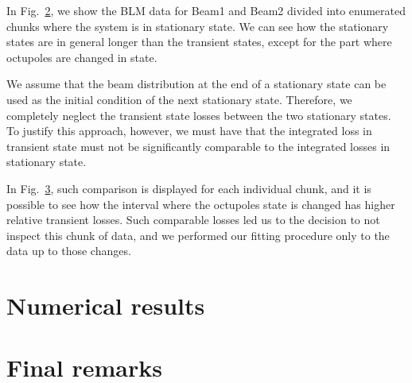 \begin{figure}
    \centering
    \caption{}
    \label{fig:transient-state}
\end{figure}

In Fig.~\ref{fig:chunks}, we show the BLM data for Beam1 and Beam2 divided into enumerated chunks where the system is in stationary state. We can see how the stationary states are in general longer than the transient states, except for the part where octupoles are changed in state.

\begin{figure}
    \centering
    \caption{}
    \label{fig:chunks}
\end{figure}

We assume that the beam distribution at the end of a stationary state can be used as the initial condition of the next stationary state. Therefore, we completely neglect the transient state losses between the two stationary states. To justify this approach, however, we must have that the integrated loss in transient state must not be significantly comparable to the integrated losses in stationary state.

In Fig.~\ref{fig:wire_loss_comp}, such comparison is displayed for each individual chunk, and it is possible to see how the interval where the octupoles state is changed has higher relative transient losses. Such comparable losses led us to the decision to not inspect this chunk of data, and we performed our fitting procedure only to the data up to those changes.

\begin{figure}
    \centering
    \caption{}
    \label{fig:wire_loss_comp}
\end{figure}



\section{Numerical results}

\section{Final remarks}
